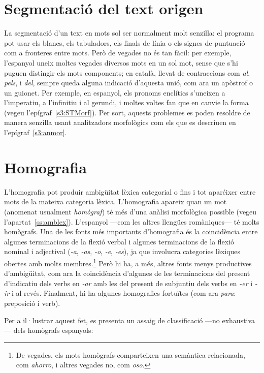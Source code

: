 \section{Segmentació del text origen}

La segmentació d'un text en mots sol ser normalment molt senzilla: el
programa pot usar els blancs, els tabuladors, els finals de línia o
els signes de puntuació com a fronteres entre mots. Però de vegades no
és tan fàcil: per exemple, l'espanyol uneix moltes vegades diversos
mots en un sol mot, sense que s'hi puguen distingir els mots
components; en català, llevat de contraccions com \emph{al},
\emph{pels}, i \emph{del}, sempre queda alguna indicació d'aquesta
unió, com ara un apòstrof o un guionet. Per exemple, en espanyol, els
pronoms enclítics s'uneixen a l'imperatiu, a l'infinitiu i al gerundi,
i moltes voltes fan que en canvie la forma (vegeu
l'epígraf~\ref{s3:STMorf}). Per sort, aquests problemes es poden
resoldre de manera senzilla usant analitzadors morfològics com els que
es descriuen en l'epígraf~\ref{s3:anmor}.

\section{Homografia}

L'homografia pot produir ambigüitat lèxica categorial o fins i tot aparéixer
entre mots de la mateixa categoria lèxica. L'homografia apareix quan un mot
(anomenat usualment \emph{homògraf}) té més d'una anàlisi morfològica
possible (vegeu l'apartat~\ref{ss:amblex}). L'espanyol ---com les
altres llengües romà\-ni\-ques--- té molts homògrafs. Una de les fonts més
importants d'homografia és la coincidència entre algunes terminacions
de la flexió verbal i algunes terminacions de la flexió nominal i
adjectival (\emph{-a}, \emph{-as}, \emph{-o}, \emph{-e}, \emph{-es}), ja
que involucra categories lèxiques obertes amb molts
membres.\footnote{De vegades, els mots homògrafs comparteixen una
  semàntica relacionada, com \emph{ahorro}, i altres vegades no, com
  \emph{oso}.} Però hi ha, a més, altres fonts menys productives
d'ambigüitat, com ara la coincidència d'algunes de les terminacions
del present d'indicatiu dels verbs en \emph{-ar} amb les del present de
subjuntiu dels verbs en \emph{-er} i \emph{-ir} i al revés. Finalment, hi ha
algunes homografies fortuïtes (com ara \emph{para}: preposició i verb).

Per a il·lustrar aquest fet, es presenta un assaig de classificació 
---no exhaustiva---  dels homògrafs espanyols:

